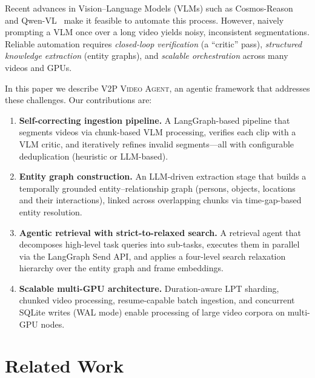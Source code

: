 \documentclass[10pt,twocolumn]{article}
\newcommand{\sys}{\textsc{V2P Video Agent}}
\begin{document}
Recent advances in Vision--Language Models (VLMs) such as
Cosmos-Reason~\cite{nvidia2025cosmos} and
Qwen-VL~\cite{bai2023qwen} make it feasible to automate this
process.  However, naively prompting a VLM once over a long video
yields noisy, inconsistent segmentations.
Reliable automation requires \emph{closed-loop verification}
(a ``critic'' pass), \emph{structured knowledge extraction}
(entity graphs), and \emph{scalable orchestration} across
many videos and GPUs.

In this paper we describe \sys{}, an agentic framework that
addresses these challenges.  Our contributions are:

\begin{enumerate}[leftmargin=*,itemsep=2pt]
  \item \textbf{Self-correcting ingestion pipeline.}
        A LangGraph-based pipeline that segments videos via
        chunk-based VLM processing, verifies each clip with a
        VLM critic, and iteratively refines invalid segments---all
        with configurable deduplication (heuristic or LLM-based).

  \item \textbf{Entity graph construction.}
        An LLM-driven extraction stage that builds a temporally
        grounded entity--relationship graph (persons, objects,
        locations and their interactions), linked across overlapping
        chunks via time-gap-based entity resolution.

  \item \textbf{Agentic retrieval with strict-to-relaxed search.}
        A retrieval agent that decomposes high-level task queries
        into sub-tasks, executes them in parallel via the LangGraph
        Send API, and applies a four-level search relaxation
        hierarchy over the entity graph and frame embeddings.

  \item \textbf{Scalable multi-GPU architecture.}
        Duration-aware LPT sharding, chunked video processing,
        resume-capable batch ingestion, and concurrent SQLite writes
        (WAL mode) enable processing of large video corpora on
        multi-GPU nodes.
\end{enumerate}

\section{Related Work}\label{sec:related}
\end{document}
